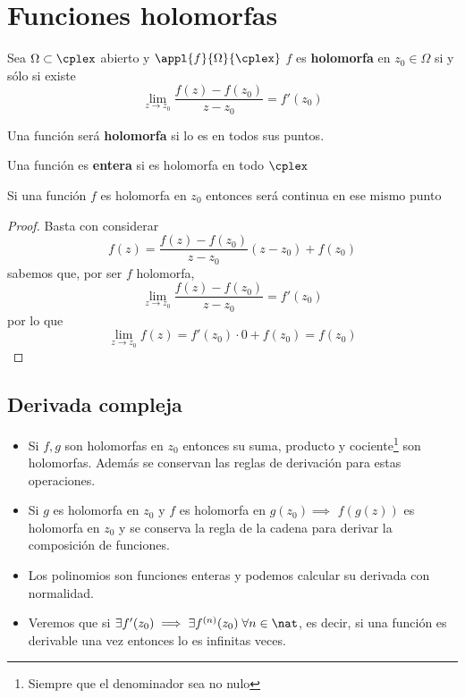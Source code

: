 \documentclass{apuntes}
\begin{document}
\chapter{Funciones holomorfas}
\begin{defn}
Sea $\Omega \subset \cplex$ abierto y $\appl{f}{\Omega}{\cplex}$ $f$ es \textbf{holomorfa} en $z_0 \in \Omega$ si y sólo si existe
\[\lim_{z\to z_0} \frac{f(z)-f(z_0)}{z-z_0}= f'(z_0)\]

Una función será \textbf{holomorfa} si lo es en todos sus puntos.
\end{defn}

\begin{defn}
Una función es \textbf{entera} si es holomorfa en todo $\cplex$
\end{defn}

\begin{prop}
Si una función $f$ es holomorfa en $z_0$ entonces será continua en ese mismo punto
\end{prop}
\begin{proof}
Basta con considerar
\[f(z)=\frac{f(z)-f(z_0)}{z-z_0}(z-z_0)+f(z_0)\]
sabemos que, por ser $f$ holomorfa,
\[\lim_{z \to z_0}\frac{f(z)-f(z_0)}{z-z_0} = f'(z_0)\]
por lo que
\[\lim_{z \to z_0} f(z) = f'(z_0)\cdot0+f(z_0)=f(z_0)\]
\end{proof}

\section{Derivada compleja}
\begin{itemize}
\item Si $f,g$ son holomorfas en $z_0$ entonces su suma, producto y cociente\footnote{Siempre que el denominador sea no nulo} son holomorfas. Además se conservan las reglas de derivación para estas operaciones.

\item Si $g$ es holomorfa en $z_0$ y $f$ es holomorfa en $g(z_0) \implies$ $f(g(z))$ es holomorfa en $z_0$ y se conserva la regla de la cadena para derivar la composición de funciones.

\item Los polinomios son funciones enteras y podemos calcular su derivada con normalidad.

\item Veremos que si $\exists f'(z_0) \implies \exists f^{(n)}(z_0)\; \forall n \in \nat$, es decir, si una función es derivable una vez entonces lo es infinitas veces.
\end{itemize}
\end{document}

